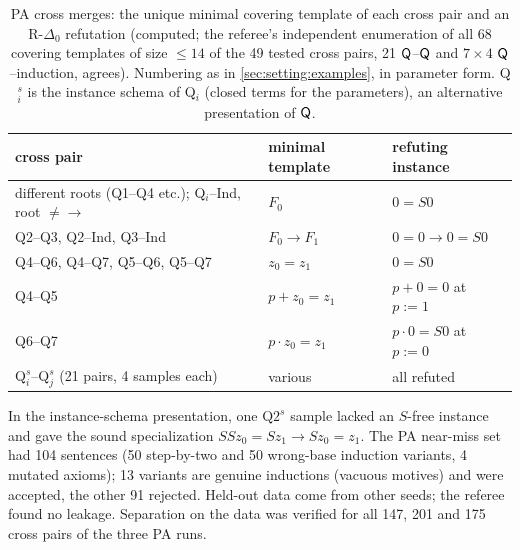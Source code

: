 \begin{table}[ht]
\centering
\caption{PA cross merges: the unique minimal covering template of each cross pair and an R-$\Delta_0$ refutation (computed;
the referee's independent enumeration of all 68 covering templates of size $\le14$ of the 49 tested cross pairs,
21 $\mathsf{Q}$--$\mathsf{Q}$ and $7\times4$ $\mathsf{Q}$--induction, agrees). Numbering as in \cref{sec:setting:examples}, in parameter form. Q$_i^s$ is the instance
schema of Q$_i$ (closed terms for the parameters), an alternative presentation of $\mathsf{Q}$.}\label{tab:many:pacross}
\begin{tabular}{lll}
\toprule
cross pair & minimal template & refuting instance\\
\midrule
different roots (Q1--Q4 etc.); Q$_i$--Ind, root $\neq\to$ & $F_0$ & $0=S0$\\
Q2--Q3, Q2--Ind, Q3--Ind & $F_0\to F_1$ & $0=0\to0=S0$\\
Q4--Q6, Q4--Q7, Q5--Q6, Q5--Q7 & $z_0=z_1$ & $0=S0$\\
Q4--Q5 & $p+z_0=z_1$ & $p+0=0$ at $p:=1$\\
Q6--Q7 & $p\cdot z_0=z_1$ & $p\cdot0=S0$ at $p:=0$\\
Q$_i^s$--Q$_j^s$ (21 pairs, 4 samples each) & various & all refuted\\
\bottomrule
\end{tabular}
\end{table}

In the instance-schema presentation, one $\mathrm{Q2}^s$ sample lacked an $S$-free instance and gave the sound
specialization $SSz_0=Sz_1\to Sz_0=z_1$. The PA near-miss set had 104 sentences (50 step-by-two and 50 wrong-base induction
variants, 4 mutated axioms); 13 variants are genuine inductions (vacuous motives) and were accepted, the other 91 rejected.
Held-out data come from other seeds; the referee found no leakage. Separation on the data was verified for all 147, 201
and 175 cross pairs of the three PA runs.

